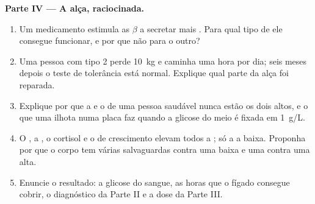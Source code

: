 \begin{problem}
\medskip
\noindent\textbf{Parte IV --- A alça, raciocinada.}
\begin{enumerate}[resume]
  \item Um medicamento estimula as  $\beta$ a secretar mais
        . Para qual tipo de  ele consegue funcionar, e
        por que não para o outro?
  \item Uma pessoa com tipo 2 perde \qty{10}{kg} e caminha uma hora por
        dia; seis meses depois o teste de tolerância está normal.
        Explique qual parte da alça foi reparada.
  \item Explique por que a  e o  de uma pessoa saudável
        nunca estão os dois altos, e o que uma ilhota numa placa faz
        quando a glicose do meio é fixada em \qty{1}{g/L}.
  \item O , a , o cortisol e o  de
        crescimento elevam todos a ; só a  a baixa.
        Proponha por que o corpo tem várias salvaguardas contra uma
         baixa e uma contra uma alta.
  \item Enuncie o resultado: a glicose do sangue, as horas que o fígado
        consegue cobrir, o diagnóstico da Parte II e a dose da Parte III.
\end{enumerate}
\end{problem}
